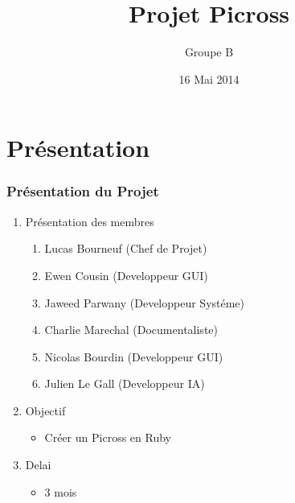 \documentclass[12pt]{beamer}
\title {Projet Picross}
\author{Groupe B}
\date{16 Mai 2014}
\institute{Université du Maine}
\begin{document}
\maketitle
\begin{frame}{}
  \tableofcontents
\end{frame}
   
\section{Présentation}
\begin{frame}
\frametitle{Présentation du Projet}
    \begin{enumerate}
     
      \item Présentation des membres
        \begin{enumerate}
        \item Lucas Bourneuf   (Chef de Projet)
        \item Ewen Cousin      (Developpeur GUI)
        \item Jaweed Parwany   (Developpeur Systéme)
        \item Charlie Marechal (Documentaliste)
        \item Nicolas Bourdin  (Developpeur GUI)
        \item Julien Le Gall    (Developpeur IA)
        \end{enumerate}\pause
     
      \item Objectif
        \begin{itemize}
            \item Créer un Picross en Ruby
        \end{itemize}\pause
     
      \item Delai
        \begin{itemize}
            \item 3 mois
        \end{itemize}
 \end{enumerate}   
 \end{frame}
    
\end{document}
